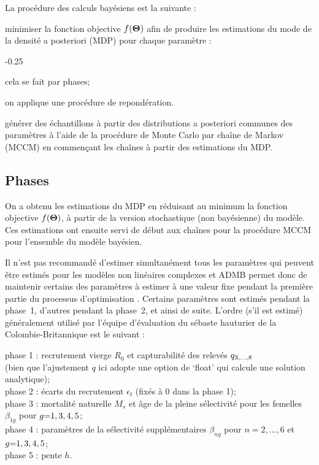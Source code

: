\documentclass[11pt]{book}
\def\bfTh{{\bf \Theta}}%
\def\bfTh{{\bf \Theta}}          %
\def\hsd{\hspace*{1ex}}
\begin{document}
La proc\'{e}dure des calculs bay\'{e}siens est la suivante :
\begin{enumerate_csas}{}{}
  \item minimiser la fonction objective $f(\bfTh)$ afin de produire les estimations du mode de la densit\'{e} a posteriori (MDP) pour chaque param\`{e}tre :
  \begin{enumerate_csas}{-0.25}{}
    \item cela se fait par phases;
    \item on applique une proc\'{e}dure de repond\'{e}ration.
  \end{enumerate_csas}
  \item g\'{e}n\'{e}rer des \'{e}chantillons \`{a} partir des distributions a posteriori communes des param\`{e}tres \`{a} l'aide de la proc\'{e}dure de Monte Carlo par cha\^{i}ne de Markov (MCCM) en commen\c{c}ant les cha\^{i}nes \`{a} partir des estimations du MDP.
\end{enumerate_csas}

\subsection{Phases}

On a obtenu les estimations du MDP en r\'{e}duisant au minimum la fonction objective $f(\bfTh)$, \`{a} partir de la version stochastique (non bay\'{e}sienne) du mod\`{e}le. 
Ces estimations ont ensuite servi de d\'{e}but aux cha\^{i}nes pour la proc\'{e}dure MCCM pour l'ensemble du mod\`{e}le bay\'{e}sien.

Il n'est pas recommand\'{e} d'estimer simultan\'{e}ment tous les param\`{e}tres qui peuvent \^{e}tre estim\'{e}s pour les mod\`{e}les non lin\'{e}aires complexes et ADMB permet donc de maintenir certains des param\`{e}tres \`{a} estimer \`{a} une valeur fixe pendant la premi\`{e}re partie du processus d'optimisation \citet{ADMB:2009}. 
Certains param\`{e}tres sont estim\'{e}s pendant la phase~1, d'autres pendant la phase~2, et ainsi de suite. L'ordre (s'il est estim\'{e}) g\'{e}n\'{e}ralement utilis\'{e} par l'\'{e}quipe d'\'{e}valuation du s\'{e}baste hauturier de la Colombie-Britannique est le suivant : 
\begin{changemargin}{0.25in}{0.25in}{0.5ex}
phase 1 : recrutement vierge $R_0$ et capturabilit\'{e} des relev\'{e}s $q_{3,...,8}$\\
  \hsd (bien que l'ajustement $q$ ici adopte une option de `float' qui calcule une solution analytique);\\
phase 2 : \'{e}carts du recrutement $\epsilon_t$ (fix\'{e}s \`{a} 0 dans la phase 1);\\
phase 3 : mortalit\'{e} naturelle $M_{s}$ et \^{a}ge de la pleine s\'{e}lectivit\'{e} pour les femelles $\beta_{1g}$ pour $g{=}1,3,4,5$;\\
phase 4 : param\`{e}tres de la s\'{e}lectivit\'{e} suppl\'{e}mentaires $\beta_{ng}$ pour $n{=}2,...,6$ et $g{=}1,3,4,5$;\\
phase 5 : pente $h$.
\end{changemargin}
\end{document}
